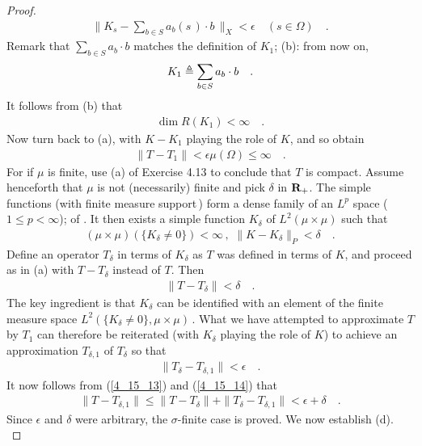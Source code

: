 \begin{proof}
\begin{align}
\| K_s - \sum_{b\in S} a_b(s\,) \cdot b\,\|_X < \epsilon \quad  (s\in \Omega)\quad .
\end{align}
Remark that $\underset{b\in S}{\sum} a_b \cdot b$ matches the definition of $K_1$; \cf(b): from now on, 
\begin{align}
K_1\triangleq \sum_{b\in S} a_b \cdot b\quad .
\end{align}
It follows from (b) that
\begin{align}
\dim R(K_1) < \infty \quad.
\end{align}
Now turn back to (a), with $K-K_1$ playing the role of $K$, and so obtain
\begin{align}
\|T-T_1\| < \epsilon \mu(\Omega)\leq \infty \quad .
\end{align}
For if $\mu$ is finite, use (a) of Exercise 4.13 to conclude that $T$ is compact. Assume henceforth that $\mu$ is not (necessarily) finite and pick $\delta$ in ${\mathbf R}_+$. The simple functions (with finite measure support\,) form a dense family of an $L^p$ space ($1\leq p<\infty$);  of \cite{BigRudin}. It then exists a simple function $K_\delta$ of $L^2(\mu\times \mu)$ such that 
\begin{align}
(\mu\times\mu)\left(\{K_\delta\neq 0\}\right) <\infty \,, \,\, \| K-K_\delta \|_P <\delta\quad .
\end{align}
Define an operator $T_\delta$ in terms of $K_\delta$ as $T$ was defined in terms of $K$, and proceed as in (a) with $T-T_\delta$ instead of $T$. Then
\begin{align}\label{4_15_13}
\|T-T_\delta\| < \delta\quad .
\end{align}
The key ingredient is that $K_\delta$ can be identified with an element of the finite measure space $L^2(\{K_\delta\neq 0\},\mu\times\mu)\,$. What we have attempted to approximate $T$ by $T_1$ can therefore be reiterated (with $K_\delta$ playing the role of $K$) to achieve an approximation $T_{\delta,1}$ of $T_\delta$ so that
\begin{align}\label{4_15_14}
\|T_{\delta}-T_{\delta,1}\| < \epsilon\quad .
\end{align}
It now follows from (\ref{4_15_13}) and (\ref{4_15_14}) that
\begin{align}
\|T-T_{\delta,1}\|\leq \|T-T_{\delta}\| +\|T_{\delta}-T_{\delta,1}\| < \epsilon+\delta\quad .
\end{align}
Since $\epsilon$ and $\delta$ were arbitrary, the $\sigma$-finite case is proved. We now establish (d).\\

\end{proof}
